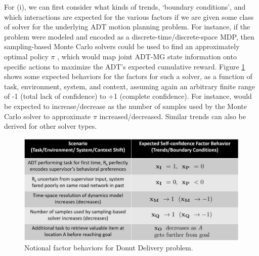 For (i), we can first consider what kinds of trends, `boundary conditions', and which interactions are expected for the various factors if we are given some class of solver for the underlying ADT motion planning problem. For instance, if the problem were modeled and encoded as a discrete-time/discrete-space MDP, then sampling-based Monte Carlo solvers could be used to find an approximately optimal policy $\pi$ \cite{Browne2012-lj}, which would map joint ADT-MG state information onto specific actions to maximize the ADT's expected cumulative reward. Figure \ref{fig:trendsBCs} shows some expected behaviors for the \famsec{} factors for such a solver, as a function of task, environment, system, and context, assuming again an arbitrary finite range of -1 (total lack of confidence) to +1 (complete confidence). For instance, \xQ{} would be expected to increase/decrease as the number of samples used by the Monte Carlo solver to approximate $\pi$ increased/decreased. Similar trends can also be derived for other solver types.  %
\begin{figure}[tbp]
    \centering
    \includegraphics[width=0.65\linewidth]{Figures/scTrendsBoundaryExample_2generic.png}
    \caption{Notional \famsec{} factor behaviors for Donut Delivery problem.}
    \label{fig:trendsBCs}
\end{figure}

